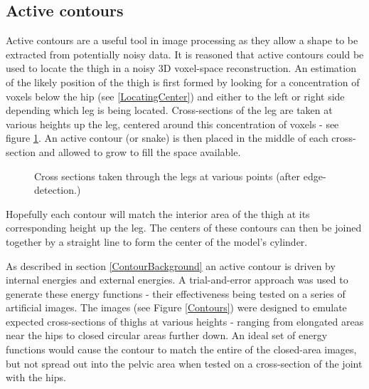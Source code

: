 \subsection{Active contours}

Active contours are a useful tool in image processing as they allow a shape to be extracted from potentially noisy data.
It is reasoned that active contours could be used to locate the thigh in a noisy 3D voxel-space reconstruction.
An estimation of the likely position of the thigh is first formed by looking for a concentration of voxels below the hip
(see \ref{LocatingCenter}) and either to the left or right side depending which leg is being located.
Cross-sections of the leg are taken at various heights up the leg, centered around this concentration of voxels - see figure \ref{CrossSections}.
An active contour (or snake) is then placed in the middle of each cross-section and allowed to grow to fill the space available.

\begin{figure}[tb]
	\vspace{-10pt}
	\centering
	\quad
	\caption{Cross sections taken through the legs at various points (after edge-detection.)}
	\label{CrossSections}
\end{figure}

Hopefully each contour will match the interior area of the thigh at its corresponding height up the leg.
The centers of these contours can then be joined together by a straight line to form the center of the model's cylinder.

As described in section \ref{ContourBackground} an active contour is driven by internal energies and external energies.
A trial-and-error approach was used to generate these energy functions - their effectiveness being tested on a series of artificial images.
The images (see Figure \ref{Contours}) were designed to emulate expected cross-sections of thighs at various heights - ranging from elongated areas
near the hips to closed circular areas further down.
An ideal set of energy functions would cause the contour to match the entire of the closed-area images, but not spread out into
the pelvic area when tested on a cross-section of the joint with the hips.

